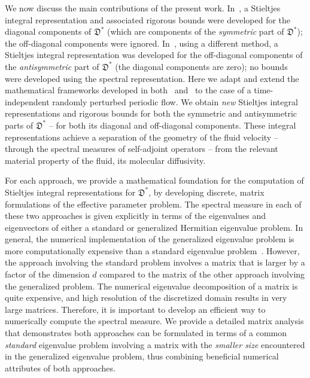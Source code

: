 \documentclass[english,12pt,jmp,graphicx]{revtex4-1}
\newcommand{\Dg}{\mathfrak{D}}
\begin{document}
We now discuss the main contributions of the present work.
In~\cite{Avellaneda:PRL-753,Avellaneda:CMP-339}, a Stieltjes integral 
representation and associated rigorous bounds were developed for
the diagonal components of $\Dg^*$ (which are components of the
\emph{symmetric} part of $\Dg^*$); the off-diagonal components were
ignored. In~\cite{Pavliotis:PHD_Thesis}, using a different method, a
Stieltjes integral representation was developed for the off-diagonal
components of the \emph{antisymmetric} part of $\Dg^*$ (the diagonal
components are zero); no bounds were developed using the spectral 
representation. Here we adapt and extend the mathematical frameworks
developed in both~\cite{Avellaneda:PRL-753,Avellaneda:CMP-339}
and~\cite{Pavliotis:PHD_Thesis} to the case of a time-independent
randomly perturbed periodic flow. We obtain \emph{new} Stieltjes
integral representations and rigorous bounds for both the symmetric
and antisymmetric parts of $\Dg^*$ -- for both its diagonal and
off-diagonal components. These integral representations 
achieve a separation of the geometry of the fluid velocity -- 
through the spectral measures of self-adjoint operators -- 
from the relevant material property of the fluid, its 
molecular diffusivity.



For each approach, we provide a
mathematical foundation for the computation of Stieltjes integral
representations for $\Dg^*$, by developing
discrete, matrix formulations of the effective parameter problem. The
spectral measure in each of these two approaches is given explicitly
in terms of the eigenvalues and eigenvectors of either a standard or
generalized Hermitian eigenvalue problem. In general, the
numerical implementation of the generalized eigenvalue problem is more
computationally expensive than a standard eigenvalue 
problem~\cite{Parlett:1980}. However, the approach involving the
standard problem involves a matrix that is larger by a
factor of the dimension $d$ compared to the matrix of the other
approach involving the generalized problem. The numerical
eigenvalue decomposition of a matrix is quite expensive,
and high resolution of the discretized domain results in very large
matrices. Therefore, it is important to develop an efficient way to
numerically compute the spectral measure. We provide a detailed matrix
analysis that demonstrates both approaches can be formulated in terms
of a common \emph{standard} eigenvalue problem involving a matrix with
the \emph{smaller size} encountered in the generalized eigenvalue problem,
thus combining beneficial numerical attributes of both
approaches. 
\end{document}
